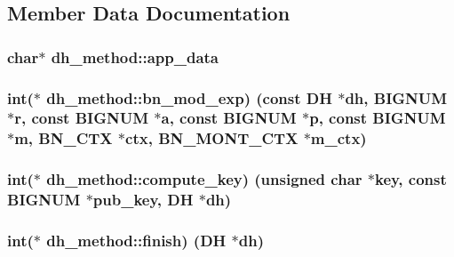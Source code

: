 \subsection{Member Data Documentation}
\subsubsection[{\texorpdfstring{app\+\_\+data}{app_data}}]{\setlength{\rightskip}{0pt plus 5cm}char$\ast$ dh\+\_\+method\+::app\+\_\+data}\hypertarget{structdh__method_a01cec981a5f6dd3386a24f083cf9812d}{}\label{structdh__method_a01cec981a5f6dd3386a24f083cf9812d}
\subsubsection[{\texorpdfstring{bn\+\_\+mod\+\_\+exp}{bn_mod_exp}}]{\setlength{\rightskip}{0pt plus 5cm}int($\ast$ dh\+\_\+method\+::bn\+\_\+mod\+\_\+exp) (const {\bf DH} $\ast$dh, {\bf B\+I\+G\+N\+UM} $\ast$r, const {\bf B\+I\+G\+N\+UM} $\ast$a, const {\bf B\+I\+G\+N\+UM} $\ast$p, const {\bf B\+I\+G\+N\+UM} $\ast$m, {\bf B\+N\+\_\+\+C\+TX} $\ast$ctx, {\bf B\+N\+\_\+\+M\+O\+N\+T\+\_\+\+C\+TX} $\ast$m\+\_\+ctx)}\hypertarget{structdh__method_af5261585e1ca4edaa2edd70a77f72274}{}\label{structdh__method_af5261585e1ca4edaa2edd70a77f72274}
\subsubsection[{\texorpdfstring{compute\+\_\+key}{compute_key}}]{\setlength{\rightskip}{0pt plus 5cm}int($\ast$ dh\+\_\+method\+::compute\+\_\+key) (unsigned char $\ast$key, const {\bf B\+I\+G\+N\+UM} $\ast$pub\+\_\+key, {\bf DH} $\ast$dh)}\hypertarget{structdh__method_a1377905955b360c0113cc24643110c28}{}\label{structdh__method_a1377905955b360c0113cc24643110c28}
\subsubsection[{\texorpdfstring{finish}{finish}}]{\setlength{\rightskip}{0pt plus 5cm}int($\ast$ dh\+\_\+method\+::finish) ({\bf DH} $\ast$dh)}\hypertarget{structdh__method_adc4990f1d4887b7a495fa452d7ebfcf2}{}\label{structdh__method_adc4990f1d4887b7a495fa452d7ebfcf2}
